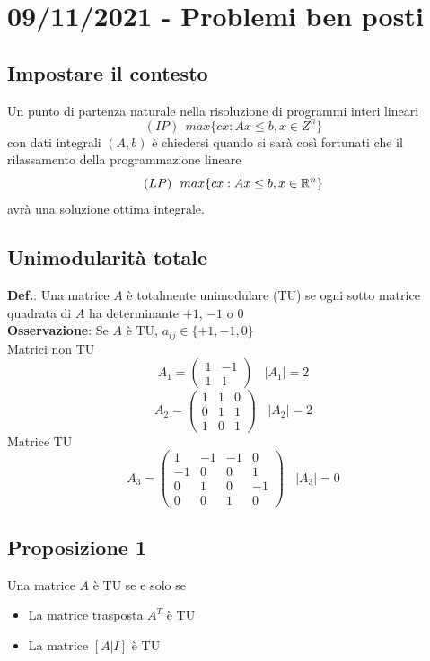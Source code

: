 \documentclass[12pt,a4paper]{article}
\begin{document}
\clearpage 
\section{09/11/2021 - Problemi ben posti}
\subsection{Impostare il contesto}
Un punto di partenza naturale nella risoluzione di programmi interi lineari $$(IP) \ \ max\{cx:Ax \leq b, x \in Z^n\}$$ con dati integrali $(A, b)$ è chiedersi quando si sarà così fortunati che il rilassamento della programmazione lineare $$(LP) \ \ max\{cx:Ax \leq b, x\in \mathbb{R}^n\}$$ avrà una soluzione ottima integrale.

\subsection{Unimodularità totale}
\textbf{Def.}: Una matrice $A$ è totalmente unimodulare (TU) se ogni sotto matrice quadrata di $A$ ha determinante $+1$, $-1$ o $0$\\
\textbf{Osservazione}: Se $A$ è TU, $a_{ij}\in\{+1,-1,0\}$\\
Matrici non TU
   $$A_1 = \left(\begin{array}{cc}1&-1\\1&1\end{array}\right) \ \ \ \ |A_1|=2$$
   $$A_2 = \left(\begin{array}{ccc}1&1&0\\0&1&1\\1&0&1\end{array}\right) \ \ \ \ |A_2|=2$$
Matrice TU
   $$A_3 = \left(\begin{array}{cccc}
   1 & -1 & -1 & 0\\
   -1 & 0 & 0 & 1\\
   0 & 1 & 0 & -1\\
   0 & 0 & 1 & 0
   \end{array}\right) \ \ \ \ |A_3| = 0$$

\subsection{Proposizione 1}
Una matrice $A$ è TU se e solo se\begin{itemize}
\item La matrice trasposta $A^T$ è TU
\item La matrice $[A|I]$ è TU
\end{itemize}
\end{document}
